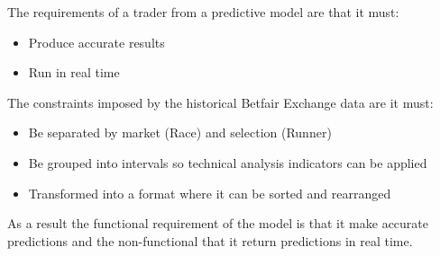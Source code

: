 The requirements of a trader from a predictive model are that it must:
	\begin{itemize}
		\item Produce accurate results
		\item Run in real time
	\end{itemize}

The constraints imposed by the historical Betfair Exchange data are it must:
	\begin{itemize}
		\item Be separated by market (Race) and selection (Runner)
		\item Be grouped into intervals so technical analysis indicators can be applied
		\item Transformed into a format where it can be sorted and rearranged
	\end{itemize}

As a result the functional requirement of the model is that it make accurate predictions and the non-functional that it return predictions in real time.